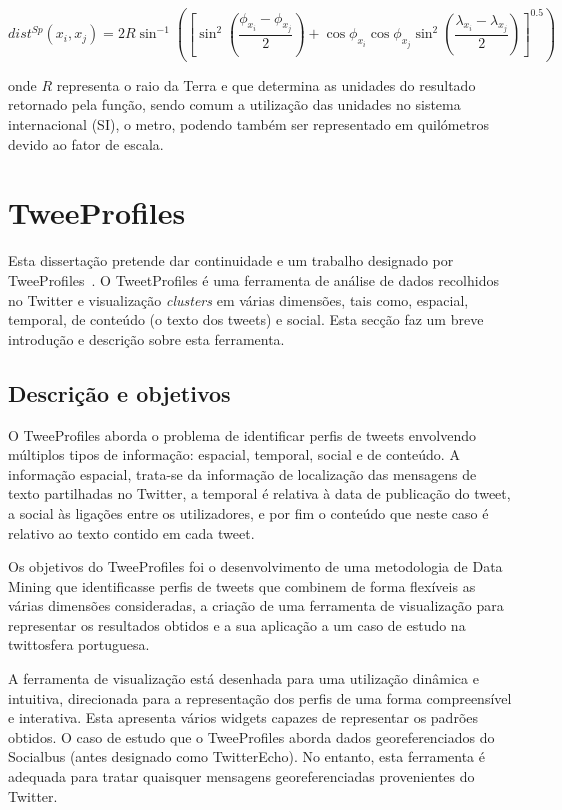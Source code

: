 \begin{equation}
dist^{Sp}( x_{i}, x_{j}) = 2R\sin^{-1}\left( \left[ \sin^{2}(\frac{\phi_{x_{i}}-\phi_{x_{j}}}{2})+\cos\phi_{x_{i}}\cos\phi_{x_{j}}\sin^{2}(\frac{\lambda_{x_{i}}-\lambda_{x_{j}}}{2})\right] ^{0.5}\right) 
\label{eq:hav} 
\end{equation}

onde $ R $ representa o raio da Terra e que determina as unidades do resultado retornado pela função, sendo comum a utilização das unidades no sistema internacional (SI), o metro, podendo também ser representado em quilómetros devido ao fator de escala. 



\section{TweeProfiles} \label{sec:tweep}

Esta dissertação pretende dar continuidade e um trabalho designado por TweeProfiles~\cite{Cunha2013}. O TweetProfiles é uma ferramenta de análise de dados recolhidos no Twitter e visualização \textit{clusters} em várias dimensões, tais como, espacial, temporal, de conteúdo (o texto dos tweets) e social. Esta secção faz um breve introdução e descrição sobre esta ferramenta.

\subsection{Descrição e objetivos}

O TweeProfiles aborda o problema de identificar perfis de tweets envolvendo múltiplos tipos de informação: espacial, temporal, social e de conteúdo. A informação espacial, trata-se da informação de localização das mensagens de texto partilhadas no Twitter, a temporal é relativa à data de publicação do tweet, a social às ligações entre os utilizadores, e por fim o conteúdo que neste caso é relativo ao texto contido em cada tweet. 

Os objetivos do TweeProfiles foi o desenvolvimento de uma metodologia de Data Mining que identificasse perfis de tweets que combinem de forma flexíveis as várias dimensões consideradas, a criação de uma ferramenta de visualização para representar os resultados obtidos e a sua aplicação a um caso de estudo na twittosfera portuguesa.
 
A ferramenta de visualização está desenhada para uma utilização dinâmica e intuitiva, direcionada para a representação dos perfis de uma forma compreensível e interativa. Esta apresenta vários widgets capazes de representar os padrões obtidos.
O caso de estudo que o TweeProfiles aborda dados georeferenciados do Socialbus (antes designado como TwitterEcho). No entanto, esta ferramenta é adequada para tratar quaisquer mensagens georeferenciadas provenientes do Twitter.

